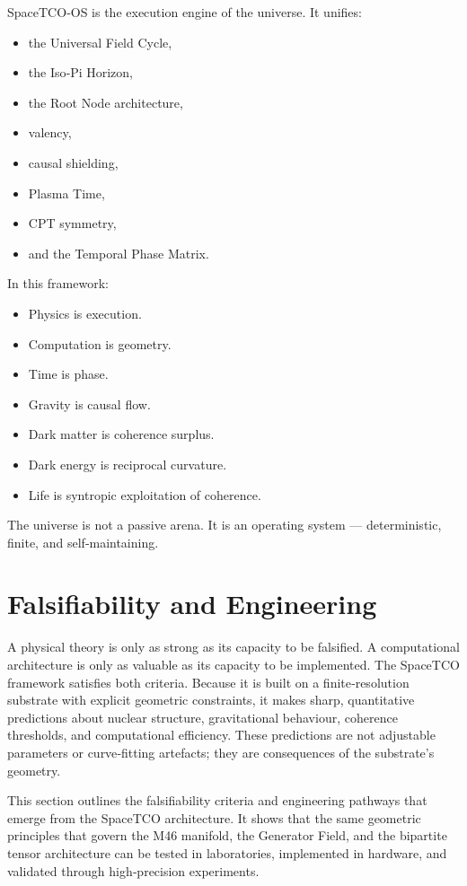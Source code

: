 \documentclass[reprint,amsmath,amssymb,aps,prl,floatfix]{revtex4-2}
\begin{document}
\begin{itemize}
SpaceTCO‑OS is the execution engine of the universe. It unifies:
\begin{itemize}
\item the Universal Field Cycle,  
\item the Iso‑Pi Horizon,  
\item the Root Node architecture,  
\item valency,  
\item causal shielding,  
\item Plasma Time,  
\item CPT symmetry,  
\item and the Temporal Phase Matrix.
\end{itemize}
\medskip

In this framework:
\begin{itemize}
\item Physics is execution.  
\item Computation is geometry.  
\item Time is phase.  
\item Gravity is causal flow.  
\item Dark matter is coherence surplus.  
\item Dark energy is reciprocal curvature.  
\item Life is syntropic exploitation of coherence.
\end{itemize}
\medskip

The universe is not a passive arena.  
It is an operating system — deterministic, finite, and self‑maintaining.

\section{Falsifiability and Engineering}

A physical theory is only as strong as its capacity to be falsified. A computational architecture is only as valuable as its capacity to be implemented. The SpaceTCO framework satisfies both criteria. Because it is built on a finite‑resolution substrate with explicit geometric constraints, it makes sharp, quantitative predictions about nuclear structure, gravitational behaviour, coherence thresholds, and computational efficiency. These predictions are not adjustable parameters or curve‑fitting artefacts; they are consequences of the substrate’s geometry.
\medskip

This section outlines the falsifiability criteria and engineering pathways that emerge from the SpaceTCO architecture. It shows that the same geometric principles that govern the M46 manifold, the Generator Field, and the bipartite tensor architecture can be tested in laboratories, implemented in hardware, and validated through high‑precision experiments.


\end{itemize}
\end{document}

